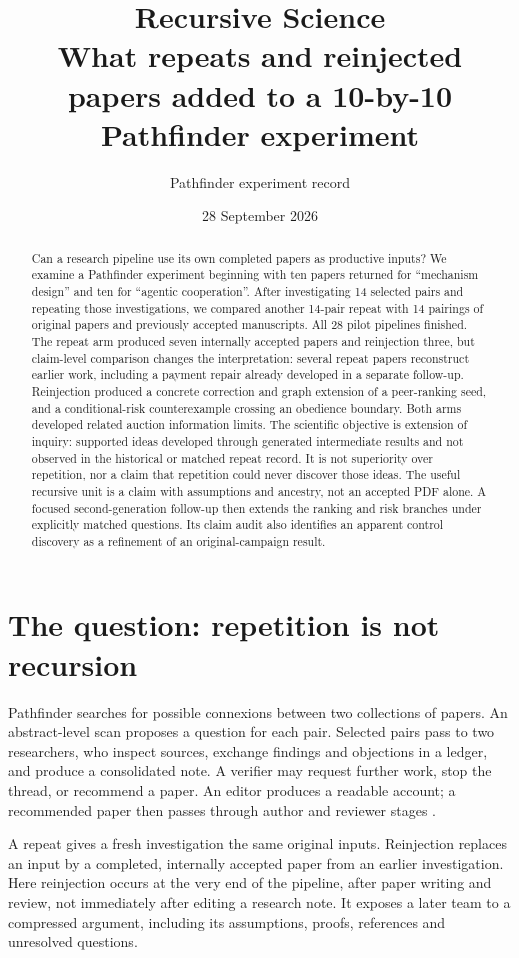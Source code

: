 \documentclass[11pt,a4paper]{article}
\title{Recursive Science\\\large What repeats and reinjected papers added to a 10-by-10 Pathfinder experiment}
\author{Pathfinder experiment record}
\date{28 September 2026}
\begin{document}
\maketitle
\begin{abstract}
Can a research pipeline use its own completed papers as productive inputs?
We examine a Pathfinder experiment beginning with ten papers returned for
``mechanism design'' and ten for ``agentic cooperation''. After investigating
14 selected pairs and repeating those investigations, we compared another
14-pair repeat with 14 pairings of original papers and previously accepted
manuscripts. All 28 pilot pipelines finished. The repeat arm produced seven
internally accepted papers and reinjection three, but claim-level comparison
changes the interpretation: several repeat papers reconstruct earlier work,
including a payment repair already developed in a separate follow-up.
Reinjection produced a concrete correction and graph extension of a
peer-ranking seed, and a conditional-risk counterexample crossing an
obedience boundary. Both arms developed related auction information limits.
The scientific objective is extension of inquiry: supported ideas developed
through generated intermediate results and not observed in the historical
or matched repeat record. It is not superiority over repetition, nor a claim
that repetition could never discover those ideas. The useful recursive
unit is a claim with assumptions and ancestry, not an accepted PDF alone.
A focused second-generation follow-up then extends the ranking and risk
branches under explicitly matched questions. Its claim audit also identifies
an apparent control discovery as a refinement of an original-campaign result.
\end{abstract}

\section{The question: repetition is not recursion}

Pathfinder searches for possible connexions between two collections of papers.
An abstract-level scan proposes a question for each pair. Selected pairs pass
to two researchers, who inspect sources, exchange findings and objections in
a ledger, and produce a consolidated note. A verifier may request further
work, stop the thread, or recommend a paper. An editor produces a readable
account; a recommended paper then passes through author and reviewer stages
\cite{engine}.

A repeat gives a fresh investigation the same original inputs. Reinjection
replaces an input by a completed, internally accepted paper from an earlier
investigation. Here reinjection occurs at the very end of the pipeline,
after paper writing and review, not immediately after editing a research note.
It exposes a later team to a compressed argument, including its assumptions,
proofs, references and unresolved questions.
\end{document}
